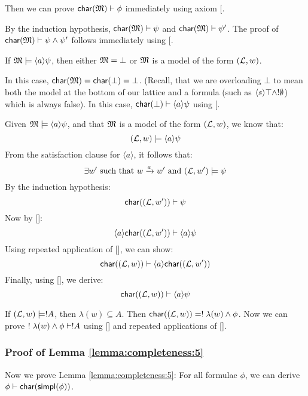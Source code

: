 
 Then we can prove $ \mathsf{char}(\frak{M}) \vdash \phi$
immediately using axiom [.

 By the induction hypothesis, $
\mathsf{char}(\frak{M}) \vdash \psi$ and $ \mathsf{char}(\frak{M}) \vdash \psi'$.  The proof
of $ \mathsf{char}(\frak{M}) \vdash \psi \land \psi'$ follows immediately using
[.

If $\frak{M} \models \langle a \rangle \psi$, then either $\MMM = \bot$ or $\frak{M}$ is a  model of the form $(\mathcal{L},w)$.

\SUBCASE{$\MMM = \bot$} In this case, $ \mathsf{char}(\frak{M}) = \mathsf{char}(\bot) =
\bot$. (Recall, that we are overloading $\bot$ to mean both the model
at the bottom of our lattice and a formula (such as $\langle s \rangle
\top \land !\emptyset$) which is always false).  In this case, $ \mathsf{char}(\bot)
\vdash \langle a \rangle \psi$ using [.

 Given $\frak{M} \models
\langle a \rangle \psi$, and that $\frak{M}$ is a model of the form
$(\mathcal{L},w)$, we know that:
\[
(\mathcal{L},w) \models \langle a \rangle \psi
\]
From the satisfaction clause for $\langle a \rangle$, it follows that:
\[
\exists w' \mbox{ such that } w \xrightarrow{a} w' \mbox { and } (\mathcal{L},w') \models \psi
\]
By the induction hypothesis:
\[
 \mathsf{char}((\mathcal{L},w')) \vdash \psi
\]
Now by []:
\[
\langle a \rangle  \mathsf{char}((\mathcal{L},w')) \vdash \langle a \rangle \psi
\]
Using repeated application of [], we can show:
\[
 \mathsf{char}((\mathcal{L},w)) \vdash \langle a \rangle  \mathsf{char}((\mathcal{L},w'))
\]
Finally, using [], we derive:
\[
 \mathsf{char}((\mathcal{L},w)) \vdash  \langle a \rangle \psi
\]

 If $(\mathcal{L},w) \models ! A$,
then $\lambda(w) \subseteq A$.  Then $ \mathsf{char}((\mathcal{L},w)) = ! \;
\lambda(w) \land \phi$.  Now we can prove $! \; \lambda(w) \land \phi
\vdash ! A$ using [] and repeated applications of
       [].

\subsubsection{Proof of Lemma \ref{lemma:completeness:5}}
\label{prooflemma5}

Now we prove Lemma \ref{lemma:completeness:5}: 
For all formulae $\phi$, we can derive $\phi \vdash \mathsf{char}(\mathsf{simpl}(\phi))$.

